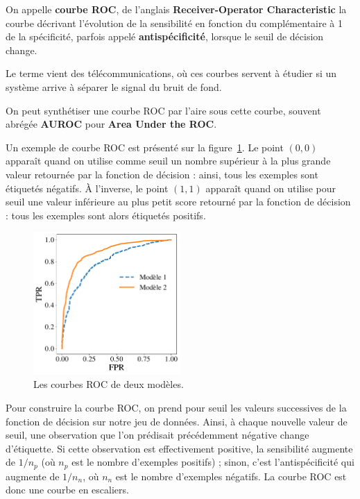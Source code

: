 On appelle \textbf{courbe ROC}, de l'anglais \textbf{Receiver-Operator
  Characteristic} la courbe décrivant l'évolution de la sensibilité en fonction
du complémentaire à 1 de la spécificité, parfois appelé \textbf{antispécificité},
lorsque le seuil de décision change.

Le terme vient des télécommunications, où ces courbes servent à étudier si un
système arrive à séparer le signal du bruit de fond.

On peut synthétiser une courbe ROC par l'aire sous cette courbe, souvent
abrégée \textbf{AUROC} pour \textbf{Area Under the ROC}.

Un exemple de courbe ROC est présenté sur la figure~\ref{fig:roc_curve}. Le
point $(0, 0)$ apparaît quand on utilise comme seuil un nombre supérieur à la
plus grande valeur retournée par la fonction de décision : ainsi, tous les
exemples sont étiquetés négatifs. À l'inverse, le point $(1, 1)$ apparaît quand
on utilise pour seuil une valeur inférieure au plus petit score retourné par la
fonction de décision : tous les exemples sont alors étiquetés positifs.

\begin{figure}[h]
  \centering
  \includegraphics[width=0.5\textwidth]{figures/generalisation/roc_curve}
  \caption{Les courbes ROC de deux modèles.}
  \label{fig:roc_curve}
\end{figure}

Pour construire la courbe ROC, on prend pour seuil les valeurs successives de
la fonction de décision sur notre jeu de données. Ainsi, à chaque nouvelle
valeur de seuil, une observation que l'on prédisait précédemment négative
change d'étiquette. Si cette observation est effectivement positive, la
sensibilité augmente de $1/n_p$ (où $n_p$ est le nombre d'exemples positifs) ;
sinon, c'est l'antispécificité qui augmente de $1/n_n$, où $n_n$ est le nombre
d'exemples négatifs. La courbe ROC est donc une courbe en escaliers.

